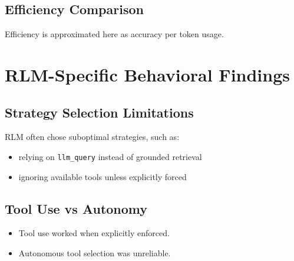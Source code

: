 \documentclass{article}
\begin{document}
\subsection{Efficiency Comparison}

Efficiency is approximated here as accuracy per token usage.

\begin{center}
\end{center}

\section{RLM-Specific Behavioral Findings}

\subsection{Strategy Selection Limitations}

RLM often chose suboptimal strategies, such as:

\begin{itemize}
    \item relying on \texttt{llm\_query} instead of grounded retrieval
    \item ignoring available tools unless explicitly forced
\end{itemize}

\subsection{Tool Use vs Autonomy}

\begin{itemize}
    \item Tool use worked when explicitly enforced.
    \item Autonomous tool selection was unreliable.
\end{itemize}
\end{document}
